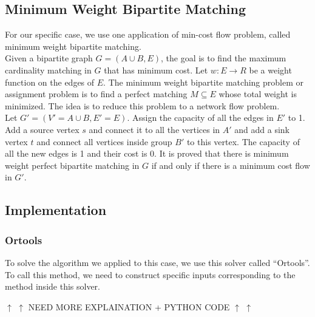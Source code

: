 \documentclass[12pt]{article}
\begin{document}
\subsection{Minimum Weight Bipartite Matching}
For our specific case, we use one application of min-cost flow problem, called minimum weight bipartite matching. \\
Given a bipartite graph $G = (A \cup B, E)$, the goal is to find the maximum cardinality matching in $G$ that has minimum cost. Let $w: E \rightarrow R$ be a weight function on the edges of $E$. The minimum weight bipartite matching problem or assignment problem is to find a perfect matching $M \subseteq E$ whose total weight is minimized. The idea is to reduce this problem to a network flow problem.\\
Let $G' = (V' = A \cup B, E' = E)$. Assign the capacity of all the edges in $E'$ to 1. Add a source vertex $s$ and connect it to all the vertices in $A'$ and add a sink vertex $t$ and connect all vertices inside group $B'$ to this vertex. The capacity of all the new edges is 1 and their cost is 0. It is proved that there is minimum weight perfect bipartite matching in $G$ if and only if there is a minimum cost flow in $G'$.

\subsection{Implementation}
\subsubsection{Ortools}
To solve the algorithm we applied to this case, we use this solver called ``Ortools''. To call this method, we need to construct specific inputs corresponding to the method inside this solver.
\begin{center}
  $\uparrow$ $\uparrow$ {\color{red}NEED MORE EXPLAINATION + PYTHON CODE} $\uparrow$ $\uparrow$
\end{center}



\end{document}
